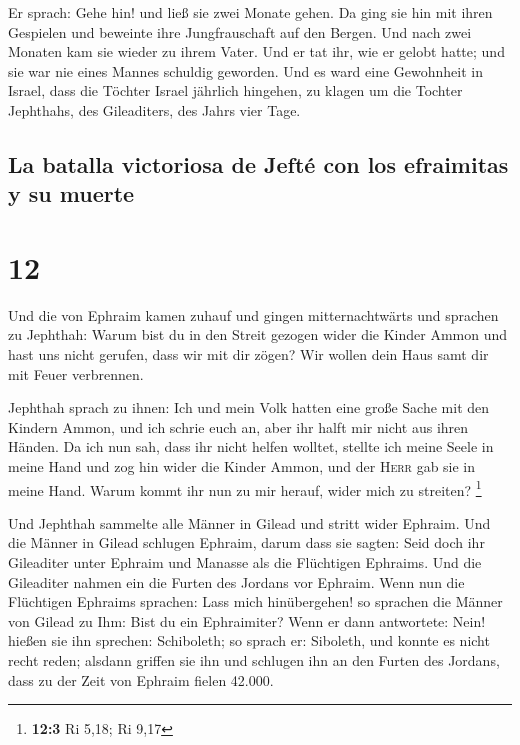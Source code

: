  Er sprach: Gehe hin! und ließ sie zwei Monate gehen. Da
ging sie hin mit ihren Gespielen und beweinte ihre Jungfrauschaft auf
den Bergen.  Und nach zwei Monaten kam sie wieder zu
ihrem Vater. Und er tat ihr, wie er gelobt hatte; und sie war nie eines
Mannes schuldig geworden. Und es ward eine Gewohnheit in Israel,
 dass die Töchter Israel jährlich hingehen, zu klagen um
die Tochter Jephthahs, des Gileaditers, des Jahrs vier Tage.

\hypertarget{la-batalla-victoriosa-de-jeftuxe9-con-los-efraimitas-y-su-muerte}{%
\subsection{La batalla victoriosa de Jefté con los efraimitas y su
muerte}\label{la-batalla-victoriosa-de-jeftuxe9-con-los-efraimitas-y-su-muerte}}

\hypertarget{section-11}{%
\section{12}\label{section-11}}

 Und die von Ephraim kamen zuhauf und gingen
mitternachtwärts und sprachen zu Jephthah: Warum bist du in den Streit
gezogen wider die Kinder Ammon und hast uns nicht gerufen, dass wir mit
dir zögen? Wir wollen dein Haus samt dir mit Feuer verbrennen.

 Jephthah sprach zu ihnen: Ich und mein Volk hatten eine
große Sache mit den Kindern Ammon, und ich schrie euch an, aber ihr
halft mir nicht aus ihren Händen.  Da ich nun sah, dass
ihr nicht helfen wolltet, stellte ich meine Seele in meine Hand und zog
hin wider die Kinder Ammon, und der \textsc{Herr} gab sie in meine Hand.
Warum kommt ihr nun zu mir herauf, wider mich zu streiten? \footnote{\textbf{12:3}
  Ri 5,18; Ri 9,17}

 Und Jephthah sammelte alle Männer in Gilead und stritt
wider Ephraim. Und die Männer in Gilead schlugen Ephraim, darum dass sie
sagten: Seid doch ihr Gileaditer unter Ephraim und Manasse als die
Flüchtigen Ephraims.  Und die Gileaditer nahmen ein die
Furten des Jordans vor Ephraim. Wenn nun die Flüchtigen Ephraims
sprachen: Lass mich hinübergehen! so sprachen die Männer von Gilead zu
Ihm: Bist du ein Ephraimiter? Wenn er dann antwortete: Nein!
 hießen sie ihn sprechen: Schiboleth; so sprach er:
Siboleth, und konnte es nicht recht reden; alsdann griffen sie ihn und
schlugen ihn an den Furten des Jordans, dass zu der Zeit von Ephraim
fielen 42.000.

